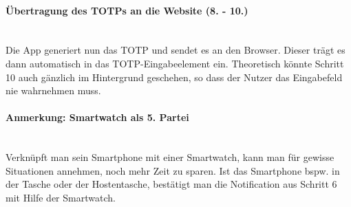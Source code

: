 \paragraph*{Übertragung des TOTPs an die Website (8. - 10.)}
\mbox{} \vspace{0.1cm} \\
Die App generiert nun das TOTP und sendet es an den Browser. Dieser trägt es dann 
automatisch in das TOTP-Eingabeelement ein. Theoretisch könnte Schritt 10 auch 
gänzlich im Hintergrund geschehen, so dass der Nutzer das Eingabefeld nie 
wahrnehmen muss.

\paragraph*{Anmerkung: Smartwatch als 5. Partei}
\mbox{} \vspace{0.1cm} \\
Verknüpft man sein Smartphone mit einer Smartwatch, kann man für gewisse Situationen annehmen, noch mehr Zeit zu sparen. Ist das Smartphone bspw. in der Tasche oder der Hostentasche, bestätigt man die Notification aus Schritt 6 mit Hilfe der Smartwatch.